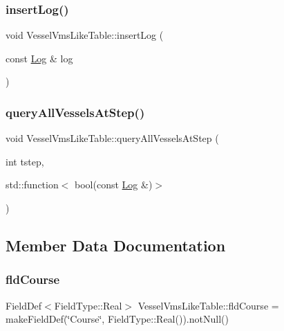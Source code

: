 \mbox{\label{class_vessel_vms_like_table_a49a885a8638b3585e044e8d0bbcf2da1}} 
\subsubsection{\texorpdfstring{insertLog()}{insertLog()}}
{\footnotesize\ttfamily void Vessel\+Vms\+Like\+Table\+::insert\+Log (\begin{DoxyParamCaption}\item[{const \mbox{\hyperlink{struct_vessel_vms_like_table_1_1_log}{Log}} \&}]{log }\end{DoxyParamCaption})}

\mbox{\label{class_vessel_vms_like_table_ad28eb28816146c416422a738b8b43fde}} 
\subsubsection{\texorpdfstring{queryAllVesselsAtStep()}{queryAllVesselsAtStep()}}
{\footnotesize\ttfamily void Vessel\+Vms\+Like\+Table\+::query\+All\+Vessels\+At\+Step (\begin{DoxyParamCaption}\item[{int}]{tstep,  }\item[{std\+::function$<$ bool(const \mbox{\hyperlink{struct_vessel_vms_like_table_1_1_log}{Log}} \&)$>$}]{ }\end{DoxyParamCaption})}



\subsection{Member Data Documentation}
\mbox{\label{class_vessel_vms_like_table_aa235f51c2df9c69e96b327193a28dfb3}} 
\subsubsection{\texorpdfstring{fldCourse}{fldCourse}}
{\footnotesize\ttfamily Field\+Def$<$Field\+Type\+::\+Real$>$ Vessel\+Vms\+Like\+Table\+::fld\+Course = make\+Field\+Def(\char`\"{}Course\char`\"{}, Field\+Type\+::\+Real()).not\+Null()}

